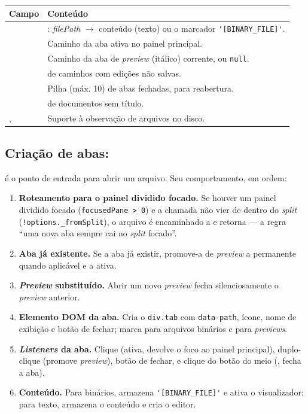 \begin{tabularx}{\linewidth}{Y Y}
\toprule
\textbf{Campo} & \textbf{Conteúdo} \\
\midrule
{} & : \emph{filePath} $\rightarrow$ conteúdo (texto) ou o marcador \lstinline|'[BINARY_FILE]'|. \\
 & Caminho da aba ativa no painel principal. \\
 & Caminho da aba de \emph{preview} (itálico) corrente, ou \lstinline|null|. \\
 &  de caminhos com edições não salvas. \\
 & Pilha (máx. 10) de abas fechadas, para reabertura. \\
 &  de documentos sem título. \\
,  & Suporte à observação de arquivos no disco. \\
\bottomrule
\end{tabularx}

\subsection{Criação de abas: }
\label{sec:editor-addtab}

 é o ponto de entrada para abrir um
arquivo. Seu comportamento, em ordem:

\begin{enumerate}[leftmargin=*]
  \item \textbf{Roteamento para o painel dividido focado.} Se houver um painel
        dividido focado (\lstinline|focusedPane > 0|) e a chamada não vier de
        dentro do \emph{split} (\lstinline|!options._fromSplit|), o arquivo é
        encaminhado a  e 
        retorna --- a regra \enquote{uma nova aba sempre cai no \emph{split}
        focado}.
  \item \textbf{Aba já existente.} Se a aba já existir, promove-a de \emph{preview}
        a permanente quando aplicável e a ativa.
  \item \textbf{\emph{Preview} substituído.} Abrir um novo \emph{preview} fecha
        silenciosamente o \emph{preview} anterior.
  \item \textbf{Elemento DOM da aba.} Cria o \lstinline|div.tab| com
        \lstinline|data-path|, ícone, nome de exibição e botão de fechar; marca
         para arquivos binários e  para
        \emph{previews}.
  \item \textbf{\emph{Listeners} da aba.} Clique (ativa, devolve o foco ao painel
        principal), duplo-clique (promove \emph{preview}), botão de fechar, e
        clique do botão do meio (, fecha a aba).
  \item \textbf{Conteúdo.} Para binários, armazena \lstinline|'[BINARY_FILE]'| e
        ativa o visualizador; para texto, armazena o conteúdo e cria o editor.
\end{enumerate}

